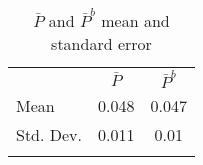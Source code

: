 \begin{table}[h]
\centering
\caption{$\bar{P}$ and $\bar{P}^b$ mean and standard error}\label{tab:pb-comp}
\begin{tabular}{lcc}
 \hline 
 & $\bar{P}$ & $\bar{P}^b$
\hline\\Mean &0.048 & 0.047\\
Std. Dev. & 0.011&0.01\\\hline\\
\end{tabular}
\end{table}

